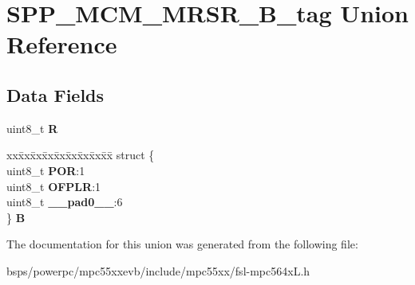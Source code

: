\hypertarget{unionSPP__MCM__MRSR__8B__tag}{}\section{S\+P\+P\+\_\+\+M\+C\+M\+\_\+\+M\+R\+S\+R\+\_\+B\+\_\+tag Union Reference}
\label{unionSPP__MCM__MRSR__8B__tag}
\subsection*{Data Fields}
\begin{DoxyCompactItemize}
\item 
\mbox{\label{unionSPP__MCM__MRSR__8B__tag_ab994db64b9a0120f2f19455d792a798d}} 
uint8\+\_\+t {\bfseries R}
\item 
\mbox{\label{unionSPP__MCM__MRSR__8B__tag_a6964296faf4d7fb739f27e1cdfdd3d9d}} 
\begin{tabbing}
xx\=xx\=xx\=xx\=xx\=xx\=xx\=xx\=xx\=\kill
struct \{\\
\>uint8\_t {\bfseries POR}:1\\
\>uint8\_t {\bfseries OFPLR}:1\\
\>uint8\_t {\bfseries \_\_pad0\_\_}:6\\
\} {\bfseries B}\\

\end{tabbing}\end{DoxyCompactItemize}


The documentation for this union was generated from the following file\+:\begin{DoxyCompactItemize}
\item 
bsps/powerpc/mpc55xxevb/include/mpc55xx/fsl-\/mpc564x\+L.\+h\end{DoxyCompactItemize}

